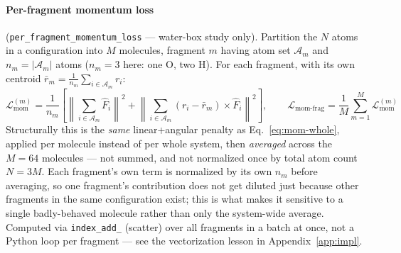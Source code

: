 \documentclass[11pt]{article}
\begin{document}
\paragraph{Per-fragment momentum loss} (\texttt{per\_fragment\_momentum\_loss}
--- water-box study only). Partition the $N$ atoms in a configuration into
$M$ molecules, fragment $m$ having atom set $\mathcal{A}_m$ and
$n_m = |\mathcal{A}_m|$ atoms ($n_m = 3$ here: one O, two H). For each
fragment, with its own centroid $\bar r_m = \frac{1}{n_m}\sum_{i\in\mathcal{A}_m} r_i$:
\begin{equation}
\mathcal{L}_{\mathrm{mom}}^{(m)} = \frac{1}{n_m}\left[
\left\lVert \textstyle\sum_{i\in\mathcal{A}_m} \hat F_i\right\rVert^2
+
\left\lVert \textstyle\sum_{i\in\mathcal{A}_m}(r_i - \bar r_m)\times \hat F_i\right\rVert^2
\right],
\qquad
\mathcal{L}_{\mathrm{mom\text{-}frag}} = \frac{1}{M}\sum_{m=1}^{M} \mathcal{L}_{\mathrm{mom}}^{(m)}
\label{eq:mom-frag}
\end{equation}
Structurally this is the \emph{same} linear+angular penalty as
Eq.~\ref{eq:mom-whole}, applied per molecule instead of per whole system,
then \emph{averaged} across the $M=64$ molecules --- not summed, and not
normalized once by total atom count $N=3M$. Each fragment's own term is
normalized by its own $n_m$ before averaging, so one fragment's contribution
does not get diluted just because other fragments in the same configuration
exist; this is what makes it sensitive to a single badly-behaved molecule
rather than only the system-wide average. Computed via \texttt{index\_add\_}
(scatter) over all fragments in a batch at once, not a Python loop per
fragment --- see the vectorization lesson in
Appendix~\ref{app:impl}.
\end{document}
